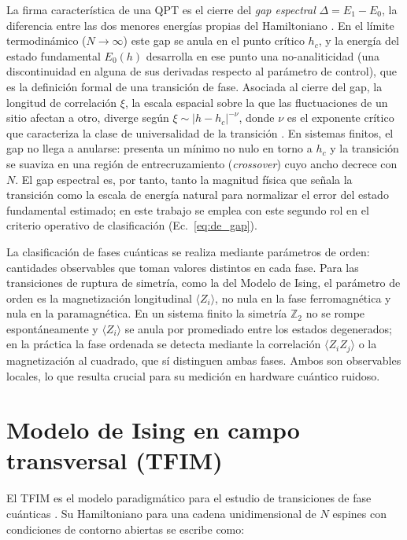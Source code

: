 \documentclass[11pt,a4paper,spanish]{book}
\begin{document}
La firma característica de una QPT es el cierre del \emph{gap espectral} $\Delta = E_1 - E_0$, la diferencia entre las dos menores energías propias del Hamiltoniano \citep{sachdev2011}. En el límite termodinámico ($N \to \infty$) este gap se anula en el punto crítico $h_c$, y la energía del estado fundamental $E_0(h)$ desarrolla en ese punto una no-analiticidad (una discontinuidad en alguna de sus derivadas respecto al parámetro de control), que es la definición formal de una transición de fase. Asociada al cierre del gap, la longitud de correlación $\xi$, la escala espacial sobre la que las fluctuaciones de un sitio afectan a otro, diverge según $\xi \sim |h - h_c|^{-\nu}$, donde $\nu$ es el exponente crítico que caracteriza la clase de universalidad de la transición \citep{dutta2015, sachdev2011}. En sistemas finitos, el gap no llega a anularse: presenta un mínimo no nulo en torno a $h_c$ y la transición se suaviza en una región de entrecruzamiento (\emph{crossover}) cuyo ancho decrece con $N$. El gap espectral es, por tanto, tanto la magnitud física que señala la transición como la escala de energía natural para normalizar el error del estado fundamental estimado; en este trabajo se emplea con este segundo rol en el criterio operativo de clasificación (Ec.~\ref{eq:de_gap}).

La clasificación de fases cuánticas se realiza mediante parámetros de orden: cantidades observables que toman valores distintos en cada fase. Para las transiciones de ruptura de simetría, como la del Modelo de Ising, el parámetro de orden es la magnetización longitudinal $\langle Z_i \rangle$, no nula en la fase ferromagnética y nula en la paramagnética. En un sistema finito la simetría $\mathbb{Z}_2$ no se rompe espontáneamente y $\langle Z_i \rangle$ se anula por promediado entre los estados degenerados; en la práctica la fase ordenada se detecta mediante la correlación $\langle Z_i Z_j \rangle$ o la magnetización al cuadrado, que sí distinguen ambas fases. Ambos son observables locales, lo que resulta crucial para su medición en hardware cuántico ruidoso.

\section{Modelo de Ising en campo transversal (TFIM)}

El TFIM es el modelo paradigmático para el estudio de transiciones de fase cuánticas \citep{dutta2015}. Su Hamiltoniano para una cadena unidimensional de $N$ espines con condiciones de contorno abiertas se escribe como:
\end{document}
